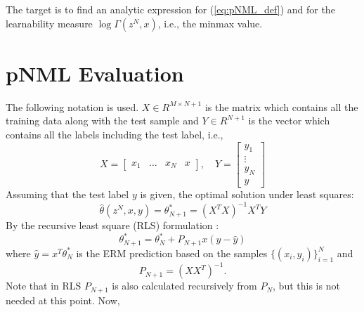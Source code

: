 \documentclass[conference,letterpaper]{IEEEtran}
\begin{document}
The target is to find an analytic expression for (\ref{eq:pNML_def}) and for the learnability measure $\log \Gamma(z^N,x)$, i.e., the minmax value.


\section{pNML Evaluation} \label{sec:pNML_eval}
The following notation is used. $X \in R^{M \times N+1}$ is the matrix which contains all the training data along with the test sample and $Y \in R^{N+1}$ is the vector which contains all the labels including the test label, i.e.,
\begin{equation}
X = \begin{bmatrix} x_1 & \dots & x_N & x \end{bmatrix}, \;\;\ \ 
Y = \begin{bmatrix} y_1 \\ \vdots \\ y_N \\ y \end{bmatrix}
\end{equation}
Assuming that the test label $y$ is given, the optimal solution under least squares:
\begin{equation}
\hat{\theta}(z^N,x,y) = \theta^*_{N+1} = (X^T X)^{-1} X^T Y
\end{equation}
By the recursive least square (RLS) formulation \cite{hayes19969}:
\begin{equation} \label{eq:rls_update}
\theta ^*_{N+1} = \theta^*_{N} + P_{N+1} x (y - \hat{y})
\end{equation}
where $\hat{y} = x^T \theta ^*_{N}$ is the ERM prediction based on the samples $\{(x_i, y_i)\}_{i=1}^{N}$ and 
\begin{equation}
P_{N+1} = (XX^T)^{-1}. 
\end{equation}
Note that in RLS $P_{N+1}$ is also calculated recursively from $P_N$, but this is not needed at this point.
Now, 
\end{document}
